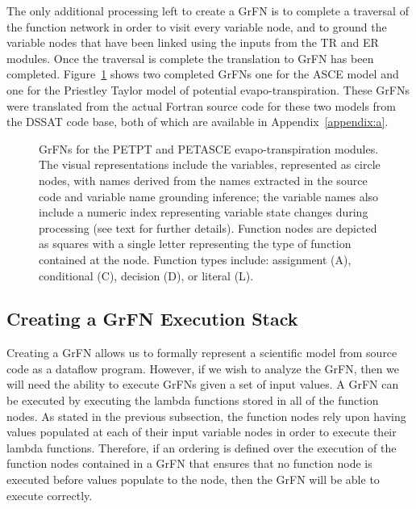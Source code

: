 The only additional processing left to create a GrFN is to complete a traversal of the function network in order to visit every variable node, and to ground the variable nodes that have been linked using the inputs from the TR and ER modules.
Once the traversal is complete the translation to GrFN has been completed.
Figure~\ref{fig:grfn_cgs} shows two completed GrFNs one for the ASCE model and one for the Priestley Taylor model of potential evapo-transpiration.
These GrFNs were translated from the actual Fortran source code for these two models from the DSSAT code base, both of which are available in Appendix~\ref{appendix:a}.

\begin{figure}[!htbp]
  \label{fig:grfn_cgs}
  \centering
  \hfill
  \caption[Evapo-transpiration GrFN Examples]{GrFNs for the PETPT and PETASCE evapo-transpiration modules. The visual representations include the variables, represented as circle nodes, with names derived from the names extracted in the source code and variable name grounding inference; the variable names also include a numeric index representing variable state changes during processing (see text for further details). Function nodes are depicted as squares with a single letter representing the type of function contained at the node. Function types include: assignment (A), conditional (C), decision (D), or literal (L).}
\end{figure}

\subsection{Creating a GrFN Execution Stack \label{sec:exec_stack_creation}}
Creating a GrFN allows us to formally represent a scientific model from source code as a dataflow program.
However, if we wish to analyze the GrFN, then we will need the ability to execute GrFNs given a set of input values.
A GrFN can be executed by executing the lambda functions stored in all of the function nodes.
As stated in the previous subsection, the function nodes rely upon having values populated at each of their input variable nodes in order to execute their lambda functions.
Therefore, if an ordering is defined over the execution of the function nodes contained in a GrFN that ensures that no function node is executed before values populate to the node, then the GrFN will be able to execute correctly.

